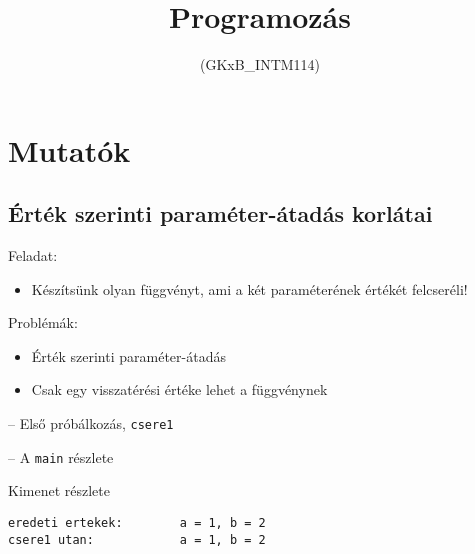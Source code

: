 \documentclass[usenames,dvipsnames,aspectratio=169]{beamer}
\title[7. előadás]{Programozás}
\subtitle{(GKxB\_INTM114)}
\begin{document}
\begin{frame}[plain]
  \titlepage
  \logoalul
\end{frame}

\section{Mutatók}
\subsection{Érték szerinti paraméter-átadás korlátai}
\begin{frame}
  Feladat:
  \begin{itemize}
    \item[] Készítsünk olyan függvényt, ami a két paraméterének értékét felcseréli!
  \end{itemize}
  Problémák:
  \begin{itemize}
    \item Érték szerinti paraméter-átadás
    \item Csak egy visszatérési értéke lehet a függvénynek
  \end{itemize}
  \begin{exampleblock}{}
    \scriptsize
    
  \end{exampleblock}
\end{frame}

\begin{frame}[fragile]
  \small
  \begin{alertblock}{ -- Első próbálkozás, \texttt{csere1}}
    \vspace{-.2cm}
    \scriptsize
    
    \vspace{-.2cm}
  \end{alertblock}
  \small
  \begin{alertblock}{ -- A \texttt{main} részlete}
    \vspace{-.2cm}
    \scriptsize
    
    \vspace{-.2cm}
  \end{alertblock}
  \small
  \begin{block}{Kimenet részlete}
    \vspace{-.3cm}
    \scriptsize
    \begin{verbatim}
eredeti ertekek:        a = 1, b = 2
csere1 utan:            a = 1, b = 2
\end{verbatim}
    \vspace{-.3cm}
  \end{block}
\end{frame}
\end{document}
